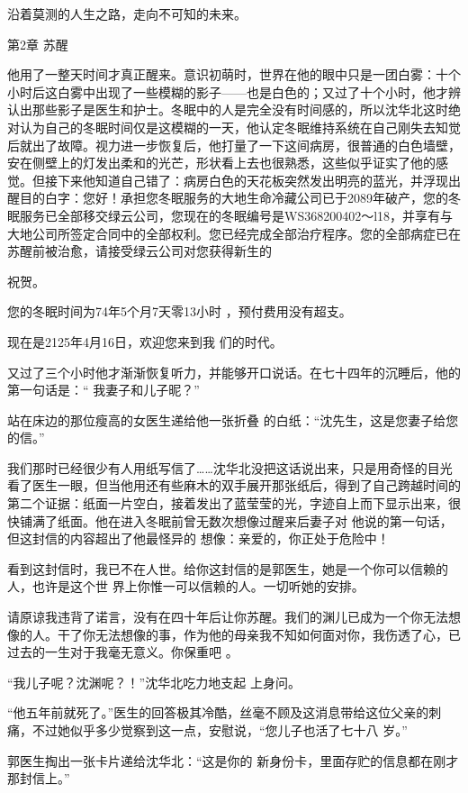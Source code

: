 \documentclass{article}
\begin{document}
沿着莫测的人生之路，走向不可知的未来。 


第2章 苏醒 

他用了一整天时间才真正醒来。意识初萌时，世界在他的眼中只是一团白雾：十个小时后这白雾中出现了一些模糊的影子——也是白色的；又过了十个小时，他才辨认出那些影子是医生和护士。冬眠中的人是完全没有时间感的，所以沈华北这时绝对认为自己的冬眠时间仅是这模糊的一天，他认定冬眠维持系统在自己刚失去知觉后就出了故障。视力进一步恢复后，他打量了一下这间病房，很普通的白色墙壁，安在侧壁上的灯发出柔和的光芒，形状看上去也很熟悉，这些似乎证实了他的感觉。但接下来他知道自己错了：病房白色的天花板突然发出明亮的蓝光，并浮现出醒目的白字：您好！承担您冬眠服务的大地生命冷藏公司已于2089年破产，您的冬眠服务已全部移交绿云公司，您现在的冬眠编号是WS368200402～l18，并享有与大地公司所签定合同中的全部权利。您已经完成全部治疗程序。您的全部病症已在苏醒前被治愈，请接受绿云公司对您获得新生的
\newpage

祝贺。 

您的冬眠时间为74年5个月7天零13小时
，预付费用没有超支。 

现在是2125年4月16日，欢迎您来到我
们的时代。 

又过了三个小时他才渐渐恢复听力，并能够开口说话。在七十四年的沉睡后，他的第一句话是：“
我妻子和儿子昵？” 

站在床边的那位瘦高的女医生递给他一张折叠
的白纸：“沈先生，这是您妻子给您的信。” 

我们那时已经很少有人用纸写信了……沈华北没把这话说出来，只是用奇怪的目光看了医生一眼，但当他用还有些麻木的双手展开那张纸后，得到了自己跨越时间的第二个证据：纸面一片空白，接着发出了蓝莹莹的光，字迹自上而下显示出来，很快铺满了纸面。他在进入冬眠前曾无数次想像过醒来后妻子对
\newpage
他说的第一句话，但这封信的内容超出了他最怪异的
想像：亲爱的，你正处于危险中！ 

看到这封信时，我已不在人世。给你这封信的是郭医生，她是一个你可以信赖的人，也许是这个世
界上你惟一可以信赖的人。一切听她的安排。 

请原谅我违背了诺言，没有在四十年后让你苏醒。我们的渊儿已成为一个你无法想像的人。干了你无法想像的事，作为他的母亲我不知如何面对你，我伤透了心，已过去的一生对于我毫无意义。你保重吧
。 

“我儿子呢？沈渊呢？！”沈华北吃力地支起
上身问。 

“他五年前就死了。”医生的回答极其冷酷，丝毫不顾及这消息带给这位父亲的刺痛，不过她似乎多少觉察到这一点，安慰说，“您儿子也活了七十八
岁。” 

\newpage

郭医生掏出一张卡片递给沈华北：“这是你的
新身份卡，里面存贮的信息都在刚才那封信上。” 
\end{document}
